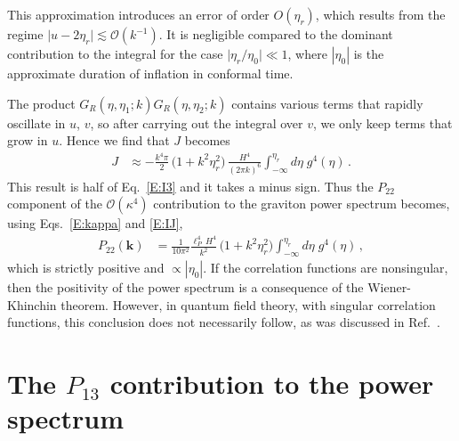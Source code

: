 \documentclass[preprint,prd,showpacs,superscriptaddress]{revtex4}
\begin{document}
 This approximation introduces an error of order ${O}(\eta_{r})$, which results from the regime 
 $\lvert u-2\eta_{r}\rvert\lesssim\mathcal{O}(k^{-1})$. It is negligible compared to the dominant contribution 
 to the integral for the case $\lvert\eta_{r}/\eta_{0}\rvert\ll1$, where $|\eta_0|$ is the approximate duration of
 inflation in conformal time. 
   
 The product $G_{R}(\eta,\eta_{1};{k})G_{R}(\eta,\eta_{2};{k})$ contains various terms that rapidly 
 oscillate in $u$, $v$, so after carrying out the integral over $v$, we only keep terms that grow in $u$. Hence we find 
 that $J$ becomes
\begin{align}\label{E:J1}
	J&\approx-\frac{k^{4}\pi}{2}\,\bigl(1+k^{2}\eta^{2}_{r}\bigr)\,\frac{H^{4}}{(2\pi k)^{6}}\int_{-\infty}^{\eta_{r}}\!
	d\eta \; g^{4}(\eta)\,.
\end{align}
This result is half of Eq.~\eqref{E:I3} and it takes a minus sign. 
Thus the $P_{22}$ component of the $\mathcal{O}(\kappa^{4})$ contribution to the graviton power spectrum
becomes, using Eqs.~\eqref{E:kappa} and \eqref{E:IJ},
\begin{align}
	P_{22}(\mathbf{k})&=\frac{1}{10\pi^{2}}\frac{\ell_P^4 \, H^{4}}{k^{2}}\,\bigl(1+k^{2}\eta_{r}^{2}\bigr)
	\int_{-\infty}^{\eta_{r}}\!d\eta \;g^{4}(\eta)\,,\label{E:P22}
\end{align}
which is strictly positive and $\propto |\eta_0|$. If the correlation functions are nonsingular, then the positivity of the power spectrum is a
consequence of the Wiener-Khinchin theorem. However, in quantum field theory, with singular correlation functions,
this conclusion does not necessarily follow, as was discussed in Ref.~\cite{HWF10}.


 \section{ The $P_{13}$ contribution to the power spectrum}
 \label{S:P13}
 
\end{document}
